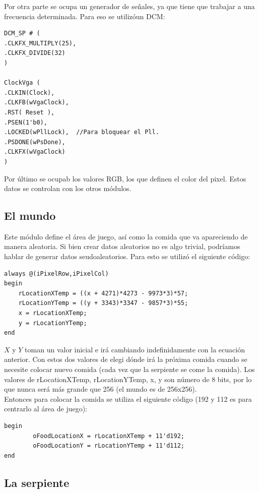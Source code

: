 \documentclass[10pt]{article}
\begin{document}
Por otra parte se ocupa un generador de señales, ya que tiene que trabajar a una frecuencia determinada. Para eso se utilizóun DCM:

\begin{lstlisting}
DCM_SP # (
.CLKFX_MULTIPLY(25),	
.CLKFX_DIVIDE(32)		
)

ClockVga (
.CLKIN(Clock),			
.CLKFB(wVgaClock), 	
.RST( Reset ),			
.PSEN(1'b0), 			
.LOCKED(wPllLock),	//Para bloquear el Pll.
.PSDONE(wPsDone),	
.CLKFX(wVgaClock)		 
)
\end{lstlisting}

Por último se ocupab los valores RGB, los que definen el color del pixel. Estos datos se controlan con los otros módulos.


\subsection{El mundo}

Este módulo define el área de juego, así como la comida que va apareciendo de manera aleatoria. Si bien crear datos aleatorios no es algo trivial, podríamos hablar de generar datos seudoaleatorios. Para esto se utilizó el siguiente código:

\begin{lstlisting}
always @(iPixelRow,iPixelCol) 
begin		
	rLocationXTemp = ((x + 4271)*4273 - 9973*3)*57;
	rLocationYTemp = ((y + 3343)*3347 - 9857*3)*55;
	x = rLocationXTemp;
	y = rLocationYTemp;
end
\end{lstlisting}

$X$ y $Y$ toman un valor inicial e irá cambiando indefinidamente con la ecuación anterior. Con estos dos valores de elegi dónde irá la próxima comida cuando se necesite colocar nuevo comida (cada vez que la serpiente se come la comida). Los valores de rLocationXTemp, rLocationYTemp, x, y son número de 8 bits, por lo que nunca será más grande que 256 (el mundo es de 256x256).\\

Entonces para colocar la comida se utiliza el siguiente código (192 y 112 es para centrarlo al área de juego):

\begin{lstlisting}
begin
		oFoodLocationX = rLocationXTemp + 11'd192;
		oFoodLocationY = rLocationYTemp + 11'd112;
end
\end{lstlisting}

\subsection{La serpiente}
\end{document}
